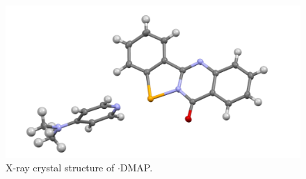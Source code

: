 \begin{refsection}
\begin{figure}
  \includegraphics[width=0.6\linewidth]{Figures/tetracycle-dmap-xtal.pdf}
  \caption{X-ray crystal structure of \texorpdfstring{$ \cdot $DMAP}{C21H18N4OSe}.}
\end{figure}

\printbibliography[heading=subbibliography]
\end{refsection}


